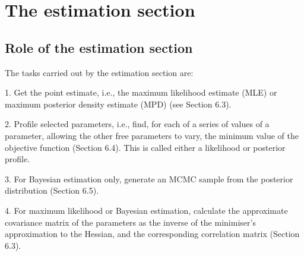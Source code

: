 \section{The estimation section\label{sec:estimation-section}}

\subsection{Role of the estimation section\label{sec:role-of-the-estimation-section}}

The tasks carried out by the estimation section are: 

1. Get the point estimate, i.e., the maximum likelihood estimate (MLE) or maximum posterior density estimate (MPD) (see Section 6.3).

2. Profile selected parameters, i.e., find, for each of a series of values of a parameter, allowing the other free parameters to vary, the minimum value of the objective function (Section 6.4). This is called either a likelihood or posterior profile. 

3. For Bayesian estimation only, generate an MCMC sample from the posterior distribution (Section 6.5).

4. For maximum likelihood or Bayesian estimation, calculate the approximate covariance matrix of the parameters as the inverse of the minimiser\textquoteright{}s approximation to the Hessian, and the corresponding correlation matrix (Section 6.3).
